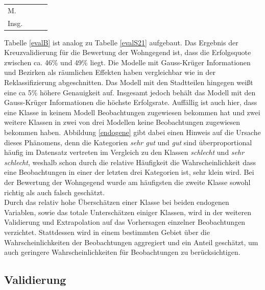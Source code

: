 \documentclass{Vorlage}
\begin{document}
\begin{table}[h]
\begin{tabular}{lc|ccccccccccccccc}
\multicolumn{2}{l|}{M.}                                                  & \multicolumn{5}{c|}{}                          & \multicolumn{5}{c|}{}                          & \multicolumn{5}{c}{}                        \\
\multicolumn{2}{l|}{Insg.}                                               & \multicolumn{5}{c|}{}                          & \multicolumn{5}{c|}{}                          & \multicolumn{5}{c}{}                        \\ \hline  \hline
\end{tabular}
\end{table}

Tabelle \ref{evalB} ist analog zu Tabelle \ref{evalS21} aufgebaut. Das Ergebnis der Kreuzvalidierung für die Bewertung der Wohngegend ist, dass die Erfolgsquote zwischen ca. 46\% und 49\% liegt. Die Modelle mit Gauss-Krüger Informationen und Bezirken als räumlichen Effekten haben vergleichbar wie in der Reklassifizierung abgeschnitten. Das Modell mit den Stadtteilen hingegen weißt eine ca 5\% höhere Genauigkeit auf. Insgesamt jedoch behält das Modell mit den Gauss-Krüger Informationen die höchste Erfolgsrate. Auffällig ist auch hier, dass eine Klasse in keinem Modell Beobachtungen zugewiesen bekommen hat und zwei weitere Klassen in zwei von drei Modellen keine Beobachtungen zugewiesen bekommen haben. Abbildung \ref{endogene} gibt dabei einen Hinweis auf die Ursache dieses Phänomens, denn die Kategorien \textit{sehr gut} und \textit{gut} sind überproportional häufig im Datensatz vertreten im Vergleich zu den Klassen \textit{schlecht} und \textit{sehr schlecht}, weshalb schon durch die relative Häufigkeit die Wahrscheinlichkeit dass eine Beobachtungen in einer der letzten drei Kategorien ist, sehr klein wird. Bei der Bewertung der Wohngegend wurde am häufigsten die zweite Klasse sowohl richtig als auch falsch geschätzt.\\
Durch das relativ hohe Überschätzen einer Klasse bei beiden endogenen Variablen, sowie das totale Unterschätzen einiger Klassen, wird in der weiteren Validierung und Extrapolation auf das Vorhersagen einzelner Beobachtungen verzichtet. Stattdessen wird in einem bestimmten Gebiet über die Wahrscheinlichkeiten der Beobachtungen aggregiert und ein Anteil geschätzt, um auch geringere Wahrscheinlichkeiten für Beobachtungen zu berücksichtigen.

\subsection{Validierung}
\end{document}
